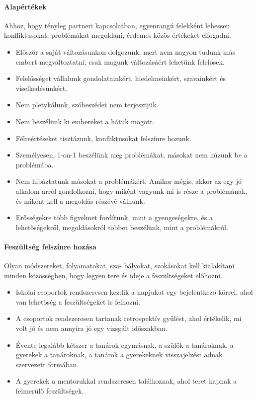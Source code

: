 \paragraph{Alapértékek}
Ahhoz, hogy tényleg partneri kapcsolatban, egyenrangú\linebreak
felekként lehessen konfliktusokat, problémákat megoldani, érdemes közös értékeket elfogadni.
\begin{itemize}
      \item Először a saját változásunkon dolgozunk, mert nem nagyon tudunk más embert megváltoztatni, csak magunk változásáért lehetünk felelősek.
      \item Felelősséget vállalunk gondolatainkért, hiedelmeinkért, szavainkért és viselkedésünkért.
      \item Nem pletykálunk, szóbeszédet nem terjesztjük.
      \item Nem beszélünk ki embereket a hátuk mögött.
      \item Félreértéseket tisztázunk, konfliktusokat felszínre hozunk.
      \item Személyesen, 1-on-1 beszélünk meg problémákat, másokat
        nem\linebreak
        húzunk be a problémába.
      \item Nem hibáztatunk másokat a problémákért. Amikor mégis, akkor az egy jó alkalom arról gondolkozni, hogy miként vagyunk mi is része a problémának, és miként kell a megoldás részévé válnunk.
      \item Erősségekre több figyelmet fordítunk, mint a gyengeségekre, és a lehetőségekről, megoldásokról többet beszélünk, mint a problémákról.
\end{itemize}

\paragraph{Feszültség felszínre hozása}
Olyan módszereket, folyamatokat,
sza-\linebreak
bá\-lyo\-kat, szokásokat kell kialakítani minden közösségben, hogy legyen tere és ideje a feszültségeket előhozni.
\begin{itemize}
      \item Iskolai csoportok rendszeresen kezdik a napjukat egy bejelentkező körrel, ahol van lehetőség a feszültségeket is felhozni.
      \item A csoportok rendszeresen tartanak retrospektív gyűlést, ahol értékelik, mi volt jó és nem annyira jó egy vizsgált időszakban.
      \item Évente legalább kétszer a tanárok egymásnak, a szülők a tanároknak, a gyerekek a tanároknak, a tanárok a gyerekeknek visszajelzést adnak szervezett formában.
      \item A gyerekek a mentorukkal rendszeresen találkoznak, ahol teret kapnak a felmerülő feszültségek.
\end{itemize}

